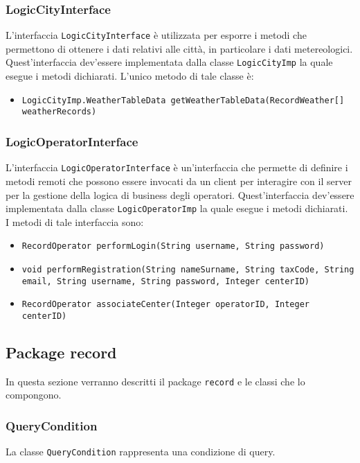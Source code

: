 \subsubsection{LogicCityInterface}
L'interfaccia \texttt{LogicCityInterface} è utilizzata per esporre i metodi che permettono di ottenere i dati relativi alle città, in particolare i dati metereologici.
Quest'interfaccia dev'essere implementata dalla classe \texttt{LogicCityImp} la quale esegue i metodi dichiarati.
L'unico metodo di tale classe è:
\begin{itemize}
    \item \texttt{LogicCityImp.WeatherTableData getWeatherTableData(RecordWeather[] weatherRecords)}
\end{itemize}

\subsubsection{LogicOperatorInterface}
L'interfaccia \texttt{LogicOperatorInterface} è un'interfaccia che permette di definire i metodi remoti che possono essere invocati da un client per interagire con il server per la gestione della logica di business degli operatori.
Quest'interfaccia dev'essere implementata dalla classe \texttt{LogicOperatorImp} la quale esegue i metodi dichiarati.
I metodi di tale interfaccia sono:
\begin{itemize}
    \item \texttt{RecordOperator performLogin(String username, String password)}
    \item \texttt{void performRegistration(String nameSurname, String taxCode, String email, String username, String password, Integer centerID)}
    \item \texttt{RecordOperator associateCenter(Integer operatorID, Integer centerID)}
\end{itemize}

\subsection{Package record}
In questa sezione verranno descritti il package \texttt{record} e le classi che lo compongono.\\

\subsubsection{QueryCondition}
La classe \texttt{QueryCondition} rappresenta una condizione di query.

